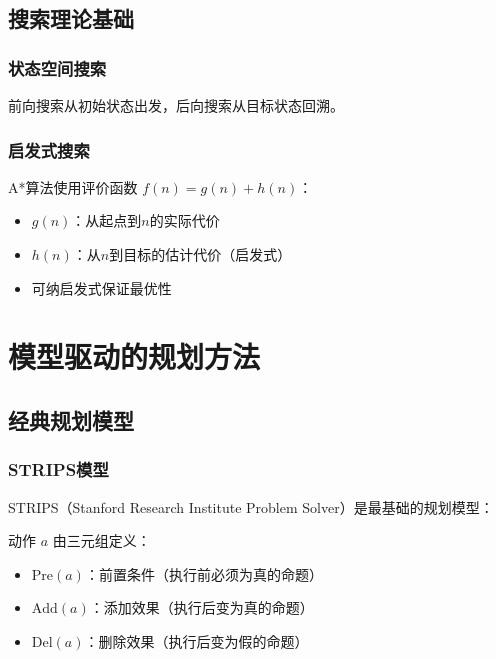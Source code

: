 \documentclass[12pt,a4paper]{ctexart}
\begin{document}
\subsection{搜索理论基础}

\subsubsection{状态空间搜索}

前向搜索从初始状态出发，后向搜索从目标状态回溯。

\subsubsection{启发式搜索}

A*算法使用评价函数 $f(n) = g(n) + h(n)$：
\begin{itemize}[leftmargin=2em]
    \item $g(n)$：从起点到$n$的实际代价
    \item $h(n)$：从$n$到目标的估计代价（启发式）
    \item 可纳启发式保证最优性
\end{itemize}

\section{模型驱动的规划方法}

\subsection{经典规划模型}

\subsubsection{STRIPS模型}

STRIPS（Stanford Research Institute Problem Solver）是最基础的规划模型：

\begin{methodbox}[STRIPS动作定义]
动作 $a$ 由三元组定义：
\begin{itemize}
    \item $\text{Pre}(a)$：前置条件（执行前必须为真的命题）
    \item $\text{Add}(a)$：添加效果（执行后变为真的命题）
    \item $\text{Del}(a)$：删除效果（执行后变为假的命题）
\end{itemize}
\end{methodbox}
\end{document}
